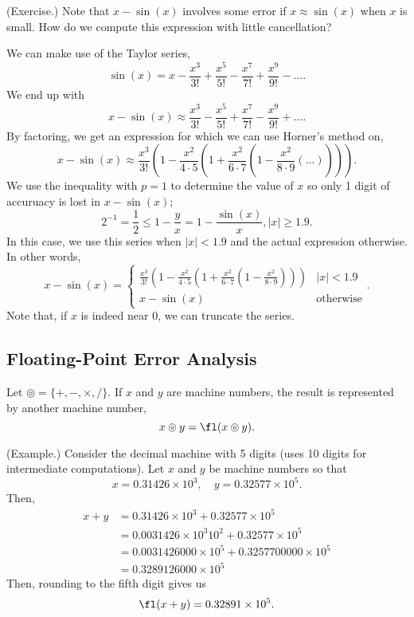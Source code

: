 \documentclass[letterpaper]{article}
\begin{document}
\begin{mdframed}
    (Exercise.) Note that $x - \sin(x)$ involves some error if $x \approx \sin(x)$ when $x$ is small. How do we compute this expression with little cancellation? 
    
    \bigskip 

    We can make use of the Taylor series, 
    \[\sin(x) = x - \frac{x^3}{3!} + \frac{x^5}{5!} - \frac{x^7}{7!} + \frac{x^9}{9!} - \hdots.\]
    We end up with 
    \[x - \sin(x) \approx \frac{x^3}{3!} - \frac{x^5}{5!} + \frac{x^7}{7!} - \frac{x^9}{9!} + \hdots.\]
    By factoring, we get an expression for which we can use Horner's method on, 
    \[x - \sin(x) \approx \frac{x^3}{3!}\left(1 - \frac{x^2}{4 \cdot 5} \left(1 + \frac{x^2}{6 \cdot 7}\left(1 - \frac{x^2}{8 \cdot 9}\left(\hdots\right)\right)\right)\right).\]
    We use the inequality with $p = 1$ to determine the value of $x$ so only 1 digit of accuruacy is lost in $x - \sin(x)$; 
    \[2^{-1} = \frac{1}{2} \leq 1 - \frac{y}{x} = 1 - \frac{\sin(x)}{x}, |x| \geq 1.9.\] In this case, we use this series when $|x| < 1.9$ and the actual expression otherwise. In other words, 
    \[x - \sin(x) = \begin{cases}
        \frac{x^3}{3!}\left(1 - \frac{x^2}{4 \cdot 5} \left(1 + \frac{x^2}{6 \cdot 7}\left(1 - \frac{x^2}{8 \cdot 9}\right)\right)\right) & |x| < 1.9 \\ 
        x - \sin(x) & \text{otherwise}
    \end{cases}.\]
    Note that, if $x$ is indeed near 0, we can truncate the series. 
\end{mdframed}

\subsection{Floating-Point Error Analysis}
Let $\circledcirc = \{+, -, \times, /\}.$ If $x$ and $y$ are machine numbers, the result is represented by another machine number, \[x \circledcirc y = \fl(x \circledcirc y).\]

\begin{mdframed}
    (Example.) Consider the decimal machine with 5 digits (uses 10 digits for intermediate computations). Let $x$ and $y$ be machine numbers so that 
    \[x = 0.31426 \times 10^3, \quad y = 0.32577 \times 10^5.\] Then, 
    \[\begin{aligned}
        x + y &= 0.31426 \times 10^3 + 0.32577 \times 10^5 \\ 
            &= 0.0031426 \times 10^3 10^2 + 0.32577 \times 10^5 \\ 
            &= 0.0031426000 \times 10^5 + 0.3257700000 \times 10^5 \\
            &= 0.3289126000 \times 10^5
    \end{aligned}\]
    Then, rounding to the fifth digit gives us 
    \[\fl(x + y) = 0.32891 \times 10^5.\]
\end{mdframed}
\end{document}
